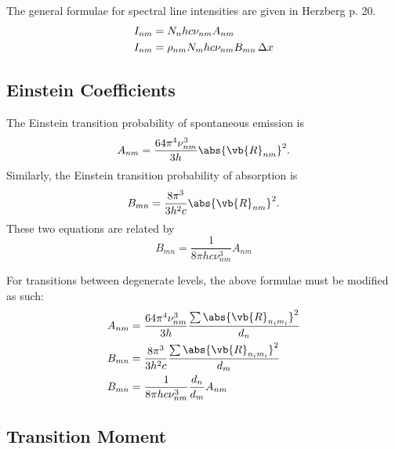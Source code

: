 \documentclass[11pt, twoside, fleqn]{report}
\begin{document}
The general formulae for spectral line intensities are given in Herzberg p. 20.
\begin{align*}
    I_{nm} & = N_{n}hc\nu_{nm}A_{nm}                  \\
    I_{nm} & = \rho_{nm}N_{m}hc\nu_{nm}B_{mn}\adif{x}
\end{align*}

\subsection{Einstein Coefficients}

The Einstein transition probability of spontaneous emission is
\begin{equation*}
    A_{nm} = \frac{64\pi^{4}\nu_{nm}^{3}}{3h}\abs{\vb{R}_{nm}}^{2}.
\end{equation*}
Similarly, the Einstein transition probability of absorption is
\begin{equation*}
    B_{mn} = \frac{8\pi^{3}}{3h^{2}c}\abs{\vb{R}_{nm}}^{2}.
\end{equation*}
These two equations are related by
\begin{equation*}
    B_{mn} = \frac{1}{8\pi hc\nu_{nm}^{3}}A_{nm}
\end{equation*}

For transitions between degenerate levels, the above formulae must be modified as such:
\begin{align*}
    A_{nm} & = \frac{64\pi^{4}\nu_{nm}^{3}}{3h}\frac{\sum\abs{\vb{R}_{n_{i}m_{i}}}^{2}}{d_{n}} \\
    B_{mn} & = \frac{8\pi^{3}}{3h^{2}c}\frac{\sum\abs{\vb{R}_{n_{i}m_{i}}}^{2}}{d_{m}}         \\
    B_{mn} & = \frac{1}{8\pi hc\nu_{nm}^{3}}\frac{d_{n}}{d_{m}}A_{nm}
\end{align*}

\subsection{Transition Moment}
\end{document}
